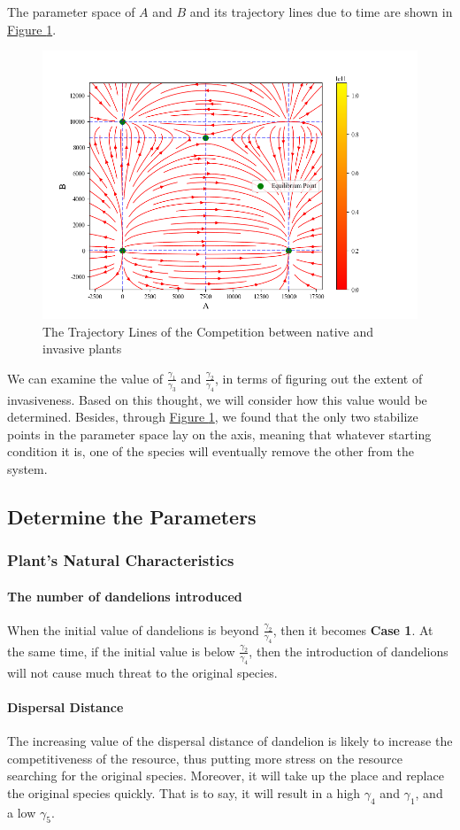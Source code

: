 \documentclass[12pt]{article}
\begin{document}
The parameter space of $A$ and $B$ and its trajectory lines due to time are shown in \hyperref[Trajectory Lines]{Figure \ref*{Trajectory Lines}}.
\begin{figure}[h]
    \centering
    \includegraphics[width=0.6\linewidth]{img/Trajectory.png}
    \caption{The Trajectory Lines of the Competition between native and invasive plants}
    \label{Trajectory Lines}
\end{figure}
We can examine the value of $\frac{\gamma_1}{\gamma_3}$ and $\frac{\gamma_2}{\gamma_4}$, in terms of figuring out the extent of invasiveness. Based on this thought, we will consider how this value would be determined. Besides, through \hyperref[Trajectory Lines]{Figure \ref*{Trajectory Lines}}, we found that the only two stabilize points in the parameter space lay on the axis, meaning that whatever starting condition it is, one of the species will eventually remove the other from the system.

\subsection{Determine the Parameters}
\subsubsection{Plant's Natural Characteristics}
\paragraph{The number of dandelions introduced}
When the initial value of dandelions is beyond $\frac{\gamma_2}{\gamma_4}$, then it becomes \textbf{Case 1}. At the same time, if the initial value is below $\frac{\gamma_2}{\gamma_4}$, then the introduction of dandelions will not cause much threat to the original species.

\paragraph{Dispersal Distance}
The increasing value of the dispersal distance of dandelion is likely to increase the competitiveness of the resource, thus putting more stress on the resource searching for the original species. Moreover, it will take up the place and replace the original species quickly. That is to say, it will result in a high $\gamma_4$ and $\gamma_1$, and a low $\gamma_5$.
\end{document}
